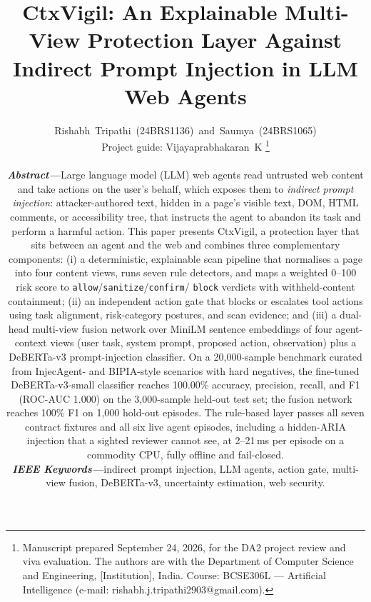 \documentclass[journal]{IEEEtran}
\begin{document}
\title{CtxVigil: An Explainable Multi-View Protection Layer Against
Indirect Prompt Injection in LLM Web Agents}

\author{Rishabh~Tripathi~(24BRS1136)~and~Saumya~(24BRS1065)\\[4pt]
{\small Project guide: Vijayaprabhakaran~K}%
\thanks{Manuscript prepared September 24, 2026, for the DA2 project review
and viva evaluation. The authors are with the Department of Computer Science
and Engineering, [Institution], India. %
Course: BCSE306L --- Artificial Intelligence
(e-mail: rishabh.j.tripathi2903@gmail.com).%
}
\\[2.5ex]
\begin{minipage}{\textwidth}
{\small\mdseries\noindent\textbf{\itshape Abstract---}Large language model
(LLM) web agents read untrusted web content and take actions on the user's
behalf, which exposes them to \emph{indirect prompt injection}:
attacker-authored text, hidden in a page's visible text, DOM, HTML comments,
or accessibility tree, that instructs the agent to abandon its task and
perform a harmful action. This paper presents CtxVigil, a protection layer
that sits between an agent and the web and combines three complementary
components: (i) a deterministic, explainable scan pipeline that normalises a
page into four content views, runs seven rule detectors, and maps a weighted
0--100 risk score to \texttt{allow}/\texttt{sanitize}/\texttt{confirm}/
\texttt{block} verdicts with withheld-content containment; (ii) an
independent action gate that blocks or escalates tool actions using task
alignment, risk-category postures, and scan evidence; and (iii) a dual-head
multi-view fusion network over MiniLM sentence embeddings of four
agent-context views (user task, system prompt, proposed action, observation)
plus a DeBERTa-v3 prompt-injection classifier. On a 20{,}000-sample benchmark
curated from InjecAgent- and BIPIA-style scenarios with hard negatives, the
fine-tuned DeBERTa-v3-small classifier reaches 100.00\% accuracy, precision,
recall, and F1 (ROC-AUC 1.000) on the 3{,}000-sample held-out test set; the
fusion network reaches 100\% F1 on 1{,}000 hold-out episodes. The rule-based
layer passes all seven contract fixtures and all six live agent episodes,
including a hidden-ARIA injection that a sighted reviewer cannot see, at
2--21\,ms per episode on a commodity CPU, fully offline and fail-closed.
\par\smallskip
\noindent\textbf{\itshape IEEE Keywords---}indirect prompt injection, LLM
agents, action gate, multi-view fusion, DeBERTa-v3, uncertainty estimation,
web security.}
\end{minipage}}
\end{document}
